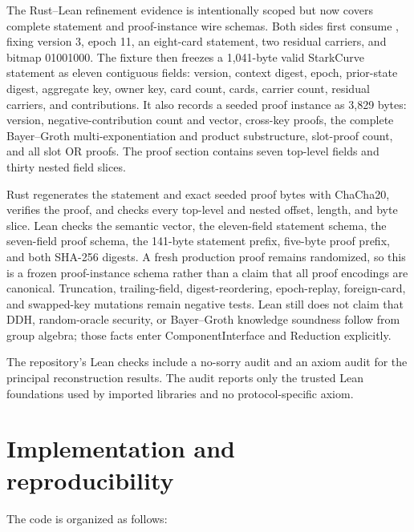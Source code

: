 \documentclass[11pt]{article}
\begin{document}
The Rust–Lean refinement evidence is intentionally scoped but now covers complete statement and proof-instance wire schemas. Both sides first consume , fixing version 3, epoch 11, an eight-card statement, two residual carriers, and bitmap 01001000. The  fixture then freezes a 1,041-byte valid StarkCurve statement as eleven contiguous fields: version, context digest, epoch, prior-state digest, aggregate key, owner key, card count, cards, carrier count, residual carriers, and contributions. It also records a seeded proof instance as 3,829 bytes: version, negative-contribution count and vector, cross-key proofs, the complete Bayer–Groth multi-exponentiation and product substructure, slot-proof count, and all slot OR proofs. The proof section contains seven top-level fields and thirty nested field slices.

Rust regenerates the statement and exact seeded proof bytes with ChaCha20, verifies the proof, and checks every top-level and nested offset, length, and byte slice. Lean checks the semantic vector, the eleven-field statement schema, the seven-field proof schema, the 141-byte statement prefix, five-byte proof prefix, and both SHA-256 digests. A fresh production proof remains randomized, so this is a frozen proof-instance schema rather than a claim that all proof encodings are canonical. Truncation, trailing-field, digest-reordering, epoch-replay, foreign-card, and swapped-key mutations remain negative tests. Lean still does not claim that DDH, random-oracle security, or Bayer–Groth knowledge soundness follow from group algebra; those facts enter ComponentInterface and Reduction explicitly.

The repository’s Lean checks include a no-sorry audit and an axiom audit for the principal reconstruction results. The audit reports only the trusted Lean foundations used by imported libraries and no protocol-specific axiom.

\section{Implementation and reproducibility}

The code is organized as follows:
\end{document}
